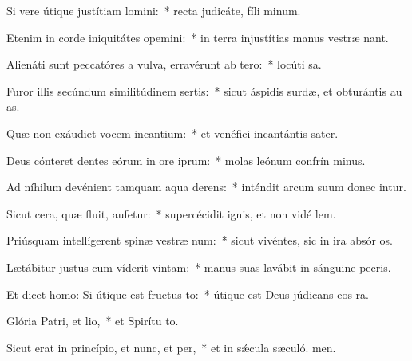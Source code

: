 \item Si vere útique justítiam lomini:~* recta judicáte, fíli minum.
\item Etenim in corde iniquitátes opemini:~* in terra injustítias manus vestræ nant.
\item Alienáti sunt peccatóres a vulva, erravérunt ab tero:~* locúti  sa.
\item Furor illis secúndum similitúdinem sertis:~* sicut áspidis surdæ, et obturántis au as.
\item Quæ non exáudiet vocem incantium:~* et venéfici incantántis sater.
\item Deus cónteret dentes eórum in ore iprum:~* molas leónum confrín minus.
\item Ad níhilum devénient tamquam aqua derens:~* inténdit arcum suum donec intur.
\item Sicut cera, quæ fluit, aufetur:~* supercécidit ignis, et non vidé lem.
\item Priúsquam intellígerent spinæ vestræ num:~* sicut vivéntes, sic in ira absór os.
\item Lætábitur justus cum víderit vintam:~* manus suas lavábit in sánguine pecris.
\item Et dicet homo: Si útique est fructus to:~* útique est Deus júdicans eos  ra.
\item Glória Patri, et lio,~* et Spirítu to.
\item Sicut erat in princípio, et nunc, et per,~* et in sǽcula sæculó. men.
